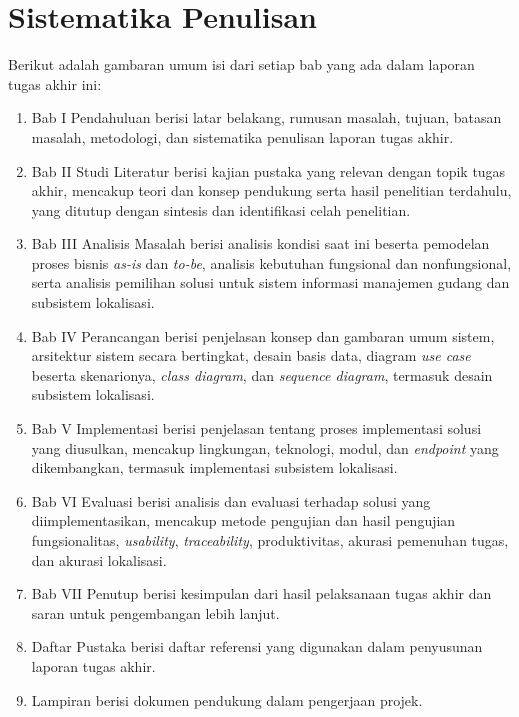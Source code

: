 \section{Sistematika Penulisan}
Berikut adalah gambaran umum isi dari setiap bab yang ada dalam laporan tugas akhir ini:
\begin{enumerate}
\item Bab I Pendahuluan berisi latar belakang, rumusan masalah, tujuan, batasan masalah, metodologi, dan sistematika penulisan laporan tugas akhir.
\item Bab II Studi Literatur berisi kajian pustaka yang relevan dengan topik tugas akhir, mencakup teori dan konsep pendukung serta hasil penelitian terdahulu, yang ditutup dengan sintesis dan identifikasi celah penelitian.
\item Bab III Analisis Masalah berisi analisis kondisi saat ini beserta pemodelan proses bisnis \textit{as-is} dan \textit{to-be}, analisis kebutuhan fungsional dan nonfungsional, serta analisis pemilihan solusi untuk sistem informasi manajemen gudang dan subsistem lokalisasi.
\item Bab IV Perancangan berisi penjelasan konsep dan gambaran umum sistem, arsitektur sistem secara bertingkat, desain basis data, diagram \textit{use case} beserta skenarionya, \textit{class diagram}, dan \textit{sequence diagram}, termasuk desain subsistem lokalisasi.
\item Bab V Implementasi berisi penjelasan tentang proses implementasi solusi yang diusulkan, mencakup lingkungan, teknologi, modul, dan \textit{endpoint} yang dikembangkan, termasuk implementasi subsistem lokalisasi.
\item Bab VI Evaluasi berisi analisis dan evaluasi terhadap solusi yang diimplementasikan, mencakup metode pengujian dan hasil pengujian fungsionalitas, \textit{usability}, \textit{traceability}, produktivitas, akurasi pemenuhan tugas, dan akurasi lokalisasi.
\item Bab VII Penutup berisi kesimpulan dari hasil pelaksanaan tugas akhir dan saran untuk pengembangan lebih lanjut.
\item Daftar Pustaka berisi daftar referensi yang digunakan dalam penyusunan laporan tugas akhir.
\item Lampiran berisi dokumen pendukung dalam pengerjaan projek.
\end{enumerate}
